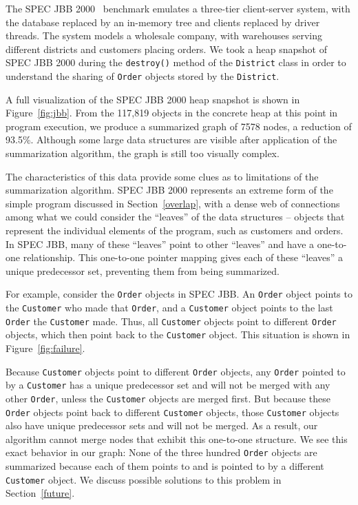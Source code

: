 The SPEC JBB 2000~\cite{specjbb2000} benchmark emulates a three-tier
client-server system, with the database replaced by an in-memory tree and
clients replaced by driver threads.  The system models a wholesale company,
with warehouses serving different districts and customers placing orders.  We
took a heap snapshot of SPEC JBB 2000 during the \texttt{destroy()} method of
the \texttt{District} class in order to understand the sharing of
\texttt{Order} objects stored by the \texttt{District}.  

A full visualization of the SPEC JBB 2000 heap snapshot is shown in
Figure~\ref{fig:jbb}.  From the 117,819 objects in the concrete heap at this
point in program execution, we produce a summarized graph of 7578 nodes, a
reduction of 93.5\%.  Although some large data structures are visible after
application of the summarization algorithm, the graph is still too 
visually complex.  

The characteristics of this data provide some clues as to limitations of the
summarization algorithm.  SPEC JBB 2000 represents an extreme form of the
simple program discussed in Section~\ref{overlap}, with a dense web of
connections among what we could consider the ``leaves'' of the data structures
-- objects that represent the individual elements of the program, such as
customers and orders.  In SPEC JBB, many of these ``leaves'' point to other
``leaves'' and have a one-to-one relationship.  This one-to-one pointer mapping
gives each of these ``leaves'' a unique predecessor set, preventing them from
being summarized.

For example, consider the \texttt{Order} objects in SPEC JBB.  An 
\texttt{Order} object points to the \texttt{Customer} who made that 
\texttt{Order}, and a \texttt{Customer} object points to the last 
\texttt{Order} the \texttt{Customer} made.  Thus, all \texttt{Customer}
objects point to different \texttt{Order} objects, which then point back
to the \texttt{Customer} object.  This situation is shown in 
Figure~\ref{fig:failure}.


Because \texttt{Customer} objects point to different \texttt{Order} objects,
any \texttt{Order} pointed to by a \texttt{Customer} has a unique predecessor
set and will not be merged with any other \texttt{Order}, unless the
\texttt{Customer} objects are merged first.  But because these \texttt{Order}
objects point back to different \texttt{Customer} objects, those
\texttt{Customer} objects also have unique predecessor sets and will not be
merged.  As a result, our algorithm cannot merge nodes that exhibit this
one-to-one structure.  We see this exact behavior in our graph: None of the
three hundred \texttt{Order} objects are summarized because each of them points
to and is pointed to by a different \texttt{Customer} object.  
We discuss possible solutions to this problem in Section~\ref{future}.

